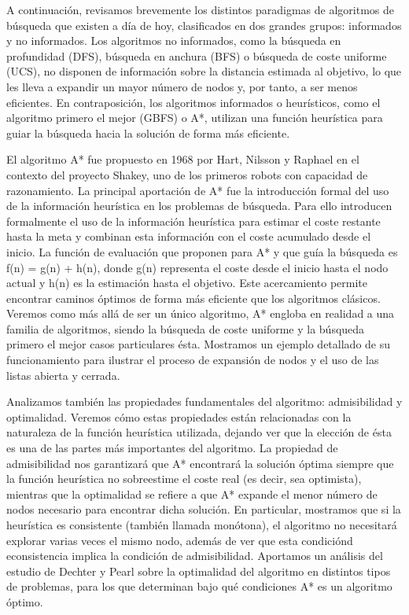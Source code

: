 \documentclass[a4paper,12pt]{article}
\begin{document}
A continuación, revisamos brevemente los distintos paradigmas de algoritmos de búsqueda que existen a día de hoy, clasificados en dos grandes grupos: informados y no informados. Los algoritmos no informados, como la búsqueda en profundidad (DFS), búsqueda en anchura (BFS) o búsqueda de coste uniforme (UCS), no disponen de información sobre la distancia estimada al objetivo, lo que les lleva a expandir un mayor número de nodos y, por tanto, a ser menos eficientes. En contraposición, los algoritmos informados o heurísticos, como el algoritmo primero el mejor (GBFS) o A*, utilizan una función heurística para guiar la búsqueda hacia la solución de forma más eficiente.

El algoritmo A* fue propuesto en 1968 por Hart, Nilsson y Raphael en el contexto del proyecto Shakey, uno de los primeros robots con capacidad de razonamiento. La principal aportación de A* fue la introducción formal del uso de la información heurística en los problemas de búsqueda. Para ello introducen formalmente el uso de la información heurística para estimar el coste restante hasta la meta y combinan esta información con el coste acumulado desde el inicio. La función de evaluación que proponen para A* y que guía la búsqueda es f(n) = g(n) + h(n), donde g(n) representa el coste desde el inicio hasta el nodo actual y h(n) es la estimación hasta el objetivo. Este acercamiento permite encontrar caminos óptimos de forma más eficiente que los algoritmos clásicos. Veremos como más allá de ser un único algoritmo, A* engloba en realidad a una familia de algoritmos, siendo la búsqueda de coste uniforme y la búsqueda primero el mejor casos particulares ésta. Mostramos un ejemplo detallado de su funcionamiento para ilustrar el proceso de expansión de nodos y el uso de las listas abierta y cerrada.

Analizamos también las propiedades fundamentales del algoritmo: admisibilidad y optimalidad. Veremos cómo estas propiedades están relacionadas con la naturaleza de la función heurística utilizada, dejando ver que la elección de ésta es una de las partes más importantes del algoritmo. La propiedad de admisibilidad nos garantizará que A* encontrará la solución óptima siempre que la función heurística no sobreestime el coste real (es decir, sea optimista), mientras que la optimalidad se refiere a que A* expande el menor número de nodos necesario para encontrar dicha solución. En particular, mostramos que si la heurística es consistente (también llamada monótona), el algoritmo no necesitará explorar varias veces el mismo nodo, además de ver que esta condiciónd econsistencia implica la condición de admisibilidad. Aportamos un análisis del estudio de Dechter y Pearl sobre la optimalidad del algoritmo en distintos tipos de problemas, para los que determinan bajo qué condiciones A* es un algoritmo óptimo.
\end{document}
